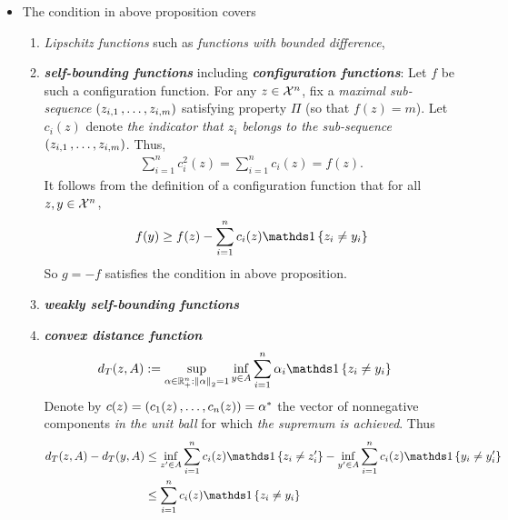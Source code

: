 \documentclass[11pt]{article}
\begin{document}
\begin{itemize}
\item \begin{remark}
The condition in above proposition covers 
\begin{enumerate}
\item \emph{Lipschitz functions} such as \emph{functions with bounded difference},  
\item \emph{\textbf{self-bounding functions}} including \emph{\textbf{configuration functions}}:
Let $f$ be such a configuration function. For any $z \in {\mathcal X}^n$, fix a \emph{maximal sub-sequence} $(z_{i,1} \,{,}\ldots{,}\, z_{i,m})$ satisfying property $\Pi$ (so that $f(z) = m$). Let $c_i(z)$ denote \emph{the indicator that $z_i$ belongs to the sub-sequence} $(z_{i,1} \,{,}\ldots{,}\, z_{i,m})$. Thus,
\begin{align*}
\sum_{i=1}^n c_i^2(z) = \sum_{i=1}^n c_i(z) = f(z).
\end{align*} It follows from the definition of a configuration function that for all $z, y \in {\mathcal X}^n$,
\begin{align*}
f(y) \ge f(z) -  \sum_{i=1}^n c_i(z)\ind{z_i \neq y_i}
\end{align*} So $g = -f$ satisfies the condition in above proposition. 
\item  \emph{\textbf{weakly self-bounding functions}}
\item \emph{\textbf{convex distance function}}
\begin{align*}
d_{T}(z, A) &:= \sup_{\alpha \in \bR_{+}^{n}: \norm{\alpha}{2} = 1}\inf_{y \in A}\sum_{i=1}^n\alpha_i \ind{z_i \neq y_i}
\end{align*} Denote by $c(z) = (c_1(z) \,{,}\ldots{,}\, c_n(z)) = \alpha^{*}$ the vector of nonnegative components \emph{in the unit ball} for which \emph{the supremum is achieved}.  Thus
\begin{align*}
d_{T}(z, A) - d_{T}(y, A) &\le  \inf_{z' \in A}\sum_{i=1}^n c_i(z) \ind{z_i \neq z_i'} -  \inf_{y' \in A}\sum_{i=1}^n c_i(z) \ind{y_i \neq y_i'}\\
&\le \sum_{i=1}^n c_i(z) \ind{z_i \neq y_i}
\end{align*}
\end{enumerate}
\end{remark}
\end{itemize}
\end{document}
